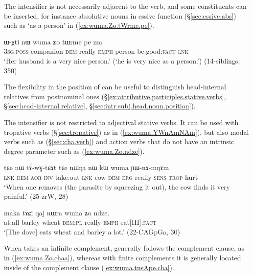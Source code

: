 The intensifier is not necessarily adjacent to the verb, and some constituents can be inserted, for instance absolutive nouns in essive function (§\ref{sec:essive.abs}) such as  `as a person' in (\ref{ex:wuma.Zo.tWrme.pe}).

\begin{exe}
\ex \label{ex:wuma.Zo.tWrme.pe}
\gll ɯ-χti nɯ wuma ʑo tɯrme pe ma \\
\textsc{3sg}.\textsc{poss}-companion \textsc{dem} really \textsc{emph} person be.good:\textsc{fact} \textsc{lnk} \\
\glt `Her husband is a very nice person.' (`he is very nice as a person.') (14-siblings, 350)
\end{exe}

The flexibility in the position of  can be useful to distinguish head-internal relatives from postnominal ones (§\ref{ex:attributive.participles.stative.verbs}, §\ref{sec:head-internal.relative}, §\ref{sec:intr.subj.head.noun.position}).

The intensifier  is not restricted to adjectival stative verbs. It can be used with tropative verbs (§\ref{sec:tropative}) as in (\ref{ex:wuma.YWnAmNAm}), but also modal verbs such as  (§\ref{sec:cha.verb}) and action verbs that do not have an intrinsic degree parameter such as  (\ref{ex:wuma.Zo.ndze}).

\begin{exe}
\ex \label{ex:wuma.YWnAmNAm}
\gll  tɕe nɯ tɤ́-wɣ-tɕɤt tɕe nɯŋa nɯ kɯ wuma ɲɯ-nɤ-mŋɤm  \\
\textsc{lnk} \textsc{dem} \textsc{aor}-\textsc{inv}-take.out \textsc{lnk} cow \textsc{dem} \textsc{erg} really \textsc{sens}-\textsc{trop}-hurt  \\
\glt `When one removes (the parasite by squeezing it out), the cow finds it very painful.' (25-zrW, 28)
\end{exe}

\begin{exe}
\ex \label{ex:wuma.Zo.ndze}
\gll  maka tɤɕi qaj nɯra wuma ʑo ndze. \\
at.all barley wheat \textsc{dem}:\textsc{pl} really \textsc{emph} eat[III]:\textsc{fact} \\
\glt `[The dove] eats wheat and barley a lot.' (22-CAGpGa, 30)
\end{exe}

When  takes an infinite complement,  generally follows the complement clause, as in (\ref{ex:wuma.Zo.chaa}), whereas with finite complements it is generally located inside of the complement clause (\ref{ex:wuma.tusApe.cha}).

